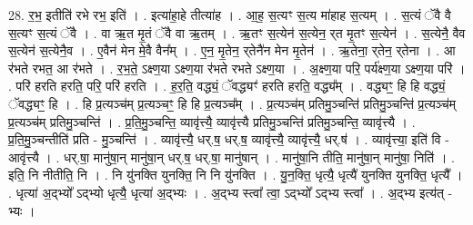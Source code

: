 \documentclass[17pt]{extarticle}
\begin{document}
28. र॒भ॒ इतीति॑ रभे रभ॒ इति॑ । . इत्या॑हा॒हे तीत्या॑ह । . आ॒ह॒ स॒त्यꣳ स॒त्य मा॑हाह स॒त्यम् । . स॒त्यं ॅवै वै स॒त्यꣳ स॒त्यं ॅवै । . वा ऋ॒त मृ॒तं ॅवै वा ऋ॒तम् । . ऋ॒तꣳ स॒त्येन॑ स॒त्येन॒ र्‌त मृ॒तꣳ स॒त्येन॑ । . स॒त्येनै॒ वैव स॒त्येन॑ स॒त्येनै॒व । . ए॒वैन॑ मेन मे॒वै वैन᳚म् । . ए॒न॒ मृ॒तेन॒ र्‌तेनै॑न मेन मृ॒तेन॑ । . ऋ॒तेना॒ र्‌तेन॒ र्‌तेना । . आ र॑भते रभत॒ आ र॑भते । . र॒भ॒ते॒ ऽक्ष्ण॒या ऽक्ष्ण॒या र॑भते रभते ऽक्ष्ण॒या । . अ॒क्ष्ण॒या परि॒ पर्य॑क्ष्ण॒या ऽक्ष्ण॒या परि॑ । . परि॑ हरति हरति॒ परि॒ परि॑ हरति । . ह॒र॒ति॒ वद्ध्यं॒ ॅवद्ध्यꣳ॑ हरति हरति॒ वद्ध्य᳚म् । . वद्ध्यꣳ॒॒ हि हि वद्ध्यं॒ ॅवद्ध्यꣳ॒॒ हि । . हि प्र॒त्यञ्च॑म् प्र॒त्यञ्चꣳ॒॒ हि हि प्र॒त्यञ्च᳚म् । . प्र॒त्यञ्च॑म् प्रतिमु॒ञ्चन्ति॑ प्रतिमु॒ञ्चन्ति॑ प्र॒त्यञ्च॑म् प्र॒त्यञ्च॑म् प्रतिमु॒ञ्चन्ति॑ । . प्र॒ति॒मु॒ञ्चन्ति॒ व्यावृ॑त्त्यै॒ व्यावृ॑त्त्यै प्रतिमु॒ञ्चन्ति॑ प्रतिमु॒ञ्चन्ति॒ व्यावृ॑त्त्यै । . प्र॒ति॒मु॒ञ्चन्तीति॑ प्रति - मु॒ञ्चन्ति॑ । . व्यावृ॑त्त्यै॒ धर्.ष॒ धर्.ष॒ व्यावृ॑त्त्यै॒ व्यावृ॑त्त्यै॒ धर्.ष॑ । . व्यावृ॑त्त्या॒ इति॑ वि - आवृ॑त्त्यै । . धर्.षा॒ मानु॑षा॒न् मानु॑षा॒न् धर्.ष॒ धर्.षा॒ मानु॑षान् । . मानु॑षा॒नि तीति॒ मानु॑षा॒न् मानु॑षा॒ निति॑ । . इति॒ नि नीतीति॒ नि । . नि यु॑नक्ति युनक्ति॒ नि नि यु॑नक्ति । . यु॒न॒क्ति॒ धृत्यै॒ धृत्यै॑ युनक्ति युनक्ति॒ धृत्यै᳚ । . धृत्या॑ अ॒द्भ्यो᳚ ऽद्भ्यो धृत्यै॒ धृत्या॑ अ॒द्भ्यः । . अ॒द्भ्य स्त्वा᳚ त्वा॒ ऽद्भ्यो᳚ ऽद्भ्य स्त्वा᳚ । . अ॒द्भ्य इत्य॑त् - भ्यः । \newline
\end{document}
